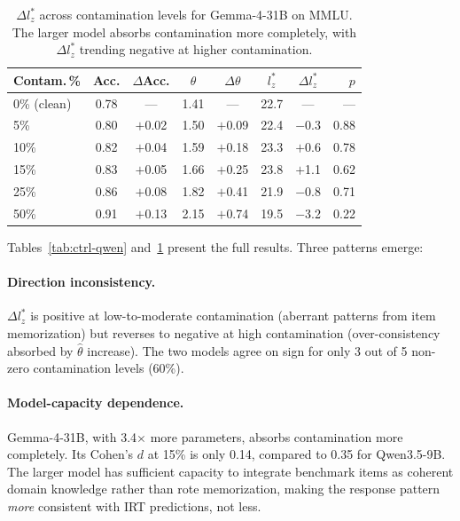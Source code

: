 \documentclass[11pt]{article}
\begin{document}
\begin{table}[t]
\centering
\caption{$\Delta l_z^*$ across contamination levels for Gemma-4-31B on MMLU. The larger model absorbs contamination more completely, with $\Delta l_z^*$ trending negative at higher contamination.}
\label{tab:ctrl-gemma}
\begin{tabular}{lccccccr}
\toprule
Contam.\,\% & Acc. & $\Delta$Acc. & $\theta$ & $\Delta\theta$ & $l_z^*$ & $\Delta l_z^*$ & $p$ \\
\midrule
0\% (clean) & 0.78 & ---    & 1.41 & ---    & 22.7 & ---    & --- \\
5\%         & 0.80 & $+$0.02 & 1.50 & $+$0.09 & 22.4 & $-$0.3  & 0.88 \\
10\%        & 0.82 & $+$0.04 & 1.59 & $+$0.18 & 23.3 & $+$0.6  & 0.78 \\
15\%        & 0.83 & $+$0.05 & 1.66 & $+$0.25 & 23.8 & $+$1.1  & 0.62 \\
25\%        & 0.86 & $+$0.08 & 1.82 & $+$0.41 & 21.9 & $-$0.8  & 0.71 \\
50\%        & 0.91 & $+$0.13 & 2.15 & $+$0.74 & 19.5 & $-$3.2  & 0.22 \\
\bottomrule
\end{tabular}
\end{table}

Tables~\ref{tab:ctrl-qwen} and~\ref{tab:ctrl-gemma} present the full results.
Three patterns emerge:

\paragraph{Direction inconsistency.}
$\Delta l_z^*$ is positive at low-to-moderate contamination (aberrant patterns from item memorization) but reverses to negative at high contamination (over-consistency absorbed by $\hat{\theta}$ increase).
The two models agree on sign for only 3 out of 5 non-zero contamination levels (60\%).

\paragraph{Model-capacity dependence.}
Gemma-4-31B, with 3.4$\times$ more parameters, absorbs contamination more completely.
Its Cohen's $d$ at 15\% is only 0.14, compared to 0.35 for Qwen3.5-9B.
The larger model has sufficient capacity to integrate benchmark items as coherent domain knowledge rather than rote memorization, making the response pattern \emph{more} consistent with IRT predictions, not less.
\end{document}

